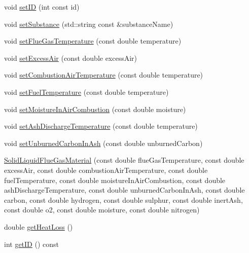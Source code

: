 \begin{DoxyCompactItemize}
\item 
void \hyperlink{class_solid_liquid_flue_gas_material_a6046d06703bd496745121b62eab4f40f}{set\+ID} (int const id)
\item 
void \hyperlink{class_solid_liquid_flue_gas_material_a54be915432c1300c4d8eaf7bf2be361f}{set\+Substance} (std\+::string const \&substance\+Name)
\item 
void \hyperlink{class_solid_liquid_flue_gas_material_ae647700dbff5ccea7938b2117f2c3156}{set\+Flue\+Gas\+Temperature} (const double temperature)
\item 
void \hyperlink{class_solid_liquid_flue_gas_material_a7a3f9f77d267afc05f5fde1da9329ec5}{set\+Excess\+Air} (const double excess\+Air)
\item 
void \hyperlink{class_solid_liquid_flue_gas_material_a626dfbc9ba87abff99e5c5a8204d69c6}{set\+Combustion\+Air\+Temperature} (const double temperature)
\item 
void \hyperlink{class_solid_liquid_flue_gas_material_a420ba1234c5f8c4b93f190b61046a589}{set\+Fuel\+Temperature} (const double temperature)
\item 
void \hyperlink{class_solid_liquid_flue_gas_material_a1a5f1bd3008e78cce62edb8aca642284}{set\+Moisture\+In\+Air\+Combustion} (const double moisture)
\item 
void \hyperlink{class_solid_liquid_flue_gas_material_ad29543a88737c3d051c7d824287bc791}{set\+Ash\+Discharge\+Temperature} (const double temperature)
\item 
void \hyperlink{class_solid_liquid_flue_gas_material_adf052dd1bdceeab710a4986b1fd874b9}{set\+Unburned\+Carbon\+In\+Ash} (const double unburned\+Carbon)
\item 
\hyperlink{class_solid_liquid_flue_gas_material_a91e7c5e670b3db4fedcbc494448644d5}{Solid\+Liquid\+Flue\+Gas\+Material} (const double flue\+Gas\+Temperature, const double excess\+Air, const double combustion\+Air\+Temperature, const double fuel\+Temperature, const double moisture\+In\+Air\+Combustion, const double ash\+Discharge\+Temperature, const double unburned\+Carbon\+In\+Ash, const double carbon, const double hydrogen, const double sulphur, const double inert\+Ash, const double o2, const double moisture, const double nitrogen)
\item 
double \hyperlink{class_solid_liquid_flue_gas_material_af7d36673e49f9b5eb631fc04227883d6}{get\+Heat\+Loss} ()
\item 
int \hyperlink{class_solid_liquid_flue_gas_material_afb124b546137da7ba99e31616198e0c8}{get\+ID} () const
\item 

\end{DoxyCompactItemize}

